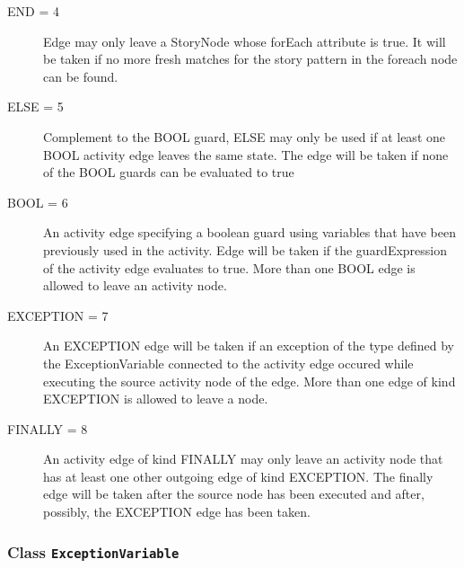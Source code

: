 \begin{description}
\begin{description}
		\item[END = 4]
		\hspace{\fill}
		\nopagebreak
		
Edge may only leave a StoryNode whose forEach attribute is true. It will be taken if no more fresh matches for the story pattern in the foreach node can be found.	

		\item[ELSE = 5]
		\hspace{\fill}
		\nopagebreak
		
Complement to the BOOL guard, ELSE may only be used if at least one BOOL activity edge leaves the same state. The edge will be taken if none of the BOOL guards can be evaluated to true	

		\item[BOOL = 6]
		\hspace{\fill}
		\nopagebreak
		
An activity edge specifying a boolean guard using variables that have been previously used in the activity. Edge will be taken if the guardExpression of the activity edge evaluates to true. More than one BOOL edge is allowed to leave an activity node.	

		\item[EXCEPTION = 7]
		\hspace{\fill}
		\nopagebreak
		
An EXCEPTION edge will be taken if an exception of the  type defined by the ExceptionVariable connected to the activity edge occured while executing the source activity node of the edge. More than one edge of kind EXCEPTION is allowed to leave a node.	

		\item[FINALLY = 8]
		\hspace{\fill}
		\nopagebreak
		
An activity edge of kind FINALLY may only leave an activity node that has at least one other outgoing edge of kind EXCEPTION. The finally edge will be taken after the source node has been executed and after, possibly, the EXCEPTION edge has been taken.	
 
	\end{description}

\end{description}



\subsubsection{\Large{Class \bfseries \texttt{ExceptionVariable}\normalfont}}
\label{cls:modeling::activities::ExceptionVariable} 
